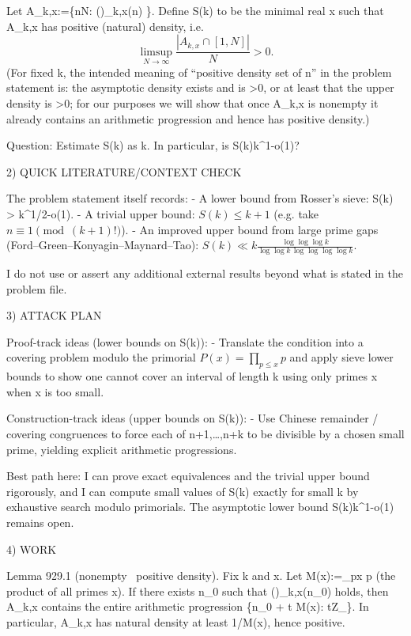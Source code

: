 Let A_{k,x}:=\{n\in\mathbb N: (\*)_{k,x}(n) \}.
Define S(k) to be the minimal real x such that A_{k,x} has positive (natural) density, i.e.
\[ \limsup_{N\to\infty} \frac{|A_{k,x}\cap[1,N]|}{N} > 0. \]
(For fixed k, the intended meaning of “positive density set of n” in the problem statement is: the asymptotic density exists and is >0, or at least that the upper density is >0; for our purposes we will show that once A_{k,x} is nonempty it already contains an arithmetic progression and hence has positive density.)

Question: Estimate S(k) as k\to\infty. In particular, is S(k)\ge k^{1-o(1)}?


2) QUICK LITERATURE/CONTEXT CHECK

The problem statement itself records:
- A lower bound from Rosser’s sieve: S(k) > k^{1/2-o(1)}.
- A trivial upper bound: \(S(k)\le k+1\) (e.g. take \(n\equiv 1 \pmod{(k+1)!}\)).
- An improved upper bound from large prime gaps (Ford–Green–Konyagin–Maynard–Tao):
  \(S(k) \ll k \frac{\log\log\log k}{\log\log k\,\log\log\log\log k}.\)

I do not use or assert any additional external results beyond what is stated in the problem file.


3) ATTACK PLAN

Proof-track ideas (lower bounds on S(k)):
- Translate the condition into a covering problem modulo the primorial \(P(x)=\prod_{p\le x} p\) and apply sieve lower bounds to show one cannot cover an interval of length k using only primes \le x when x is too small.

Construction-track ideas (upper bounds on S(k)):
- Use Chinese remainder / covering congruences to force each of n+1,\dots,n+k to be divisible by a chosen small prime, yielding explicit arithmetic progressions.

Best path here: I can prove exact equivalences and the trivial upper bound rigorously, and I can compute small values of S(k) exactly for small k by exhaustive search modulo primorials. The asymptotic lower bound S(k)\ge k^{1-o(1)} remains open.


4) WORK

Lemma 929.1 (nonempty \Rightarrow\ positive density).
Fix k and x.
Let M(x):=\prod_{p\le x} p (the product of all primes \le x).
If there exists n_0 such that (\*)_{k,x}(n_0) holds, then A_{k,x} contains the entire arithmetic progression \{n_0 + t M(x): t\in\mathbb Z_{}\}.
In particular, A_{k,x} has natural density at least 1/M(x), hence positive.

